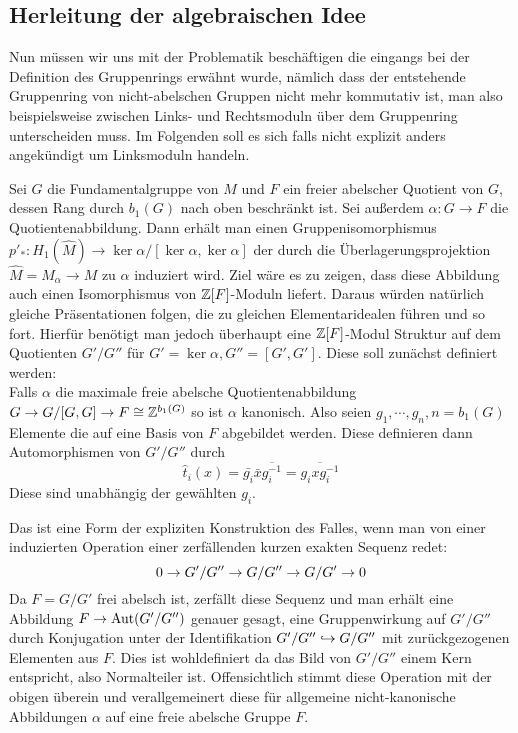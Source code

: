 \subsection{Herleitung der algebraischen Idee}
    
Nun müssen wir uns mit der Problematik beschäftigen die eingangs bei der Definition des Gruppenrings erwähnt wurde, nämlich dass der entstehende Gruppenring von nicht-abelschen Gruppen nicht mehr kommutativ ist, man also beispielsweise zwischen Links- und Rechtsmoduln über dem Gruppenring unterscheiden muss. Im Folgenden soll es sich falls nicht explizit anders angekündigt um Linksmoduln handeln.

Sei $G$ die Fundamentalgruppe von $M$ und $F$ ein freier abelscher Quotient von $G$, dessen Rang durch $b_1(G)$ nach oben beschränkt ist. Sei außerdem $\alpha:G\to F$ die Quotientenabbildung. Dann erhält man einen Gruppenisomorphismus $p'_*: H_1(\hat M) \to \ker\alpha/[\ker\alpha,\ker\alpha]$ der durch die Überlagerungsprojektion $\hat M = M_\alpha \to M$ zu $\alpha$ induziert wird. Ziel wäre es zu zeigen, dass diese Abbildung auch einen Isomorphismus von $\mathbb{Z}[F]$-Moduln liefert. Daraus würden natürlich gleiche Präsentationen folgen, die zu gleichen Elementaridealen führen und so fort. Hierfür benötigt man jedoch überhaupt eine $\mathbb{Z}[F]$-Modul Struktur auf dem Quotienten $G'/G''$ für $G'=\ker\alpha, G''=[G',G']$. Diese soll zunächst definiert werden:\\
Falls $\alpha$ die maximale freie abelsche Quotientenabbildung $G \to G/[G,G] \to F \cong \mathbb{Z}^{b_1(G)}$ so ist $\alpha$ kanonisch. Also seien $g_1,\cdots,g_n,n=b_1(G)$ Elemente die auf eine Basis von $F$ abgebildet werden. Diese definieren dann Automorphismen von $G'/G''$ durch 
\[
	\hat t_i(x) = \bar{ g_i} \bar{ x}\overline{ g_i^{-1}} = \overline{{} g_i x g_i^{-1}}
\]
Diese sind unabhängig der gewählten $g_i$. 
\begin{bem}
 	Das ist eine Form der expliziten Konstruktion des Falles, wenn man von einer induzierten Operation einer zerfällenden kurzen exakten Sequenz redet:
 	\[
 		0\to G'/G''\to G/G''\to G/G'\to0
 	\]
 	Da $F= G/G'$ frei abelsch ist, zerfällt diese Sequenz und man erhält eine Abbildung $F \to \operatorname{Aut}(G'/G'')$ genauer gesagt, eine Gruppenwirkung auf $G'/G''$ durch Konjugation unter der Identifikation $G'/G''\hookrightarrow G/G''$ mit zurückgezogenen Elementen aus $F$. Dies ist wohldefiniert da das Bild von $G'/G''$ einem Kern entspricht, also Normalteiler ist. Offensichtlich stimmt diese Operation mit der obigen überein und verallgemeinert diese für allgemeine nicht-kanonische Abbildungen $\alpha$ auf eine freie abelsche Gruppe $F$.
 \end{bem} 

